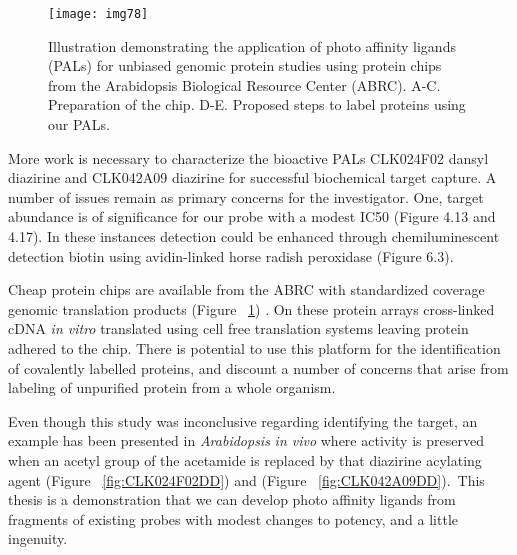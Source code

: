 \begin{figure}
\centering
\texttt{[image: img78]}
\caption{Illustration demonstrating the application of photo affinity ligands (PALs) for unbiased genomic protein studies using protein chips from the Arabidopsis Biological Resource Center (ABRC). A-C. Preparation of the chip. D-E. Proposed steps to label proteins using our PALs.}
\label{fig:DiazirineonABRCchips}
\end{figure}

More work is necessary to characterize the bioactive PALs CLK024F02 dansyl diazirine and CLK042A09 diazirine for successful biochemical target capture. A number of issues remain as primary concerns for the investigator. One, target abundance is of significance for our probe with a modest IC50 (Figure 4.13 and 4.17). In these instances detection could be enhanced through chemiluminescent detection biotin using avidin-linked horse radish peroxidase (Figure 6.3).

Cheap protein chips are available from the ABRC with standardized coverage genomic translation products (Figure ~\ref{fig:DiazirineonABRCchips}) \cite{zhu2003protein}. On these protein arrays cross-linked cDNA {\it in vitro} translated using cell free translation systems leaving protein adhered to the chip. There is potential to use this platform for the identification of covalently labelled proteins, and discount a number of concerns that arise from labeling of unpurified protein from a whole organism.

Even though this study was inconclusive regarding identifying the target, an example has been presented in {\it Arabidopsis} {\it in vivo} where activity is preserved when an acetyl group of the acetamide is replaced by that diazirine acylating agent (Figure ~\ref{fig:CLK024F02DD}) and (Figure ~\ref{fig:CLK042A09DD}). This thesis is a demonstration that we can develop photo affinity ligands from fragments of existing probes with modest changes to potency, and a little ingenuity. 